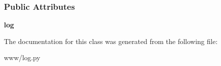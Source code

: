 \subsubsection*{Public Attributes}
\begin{DoxyCompactItemize}
\item 
\hypertarget{classlog_1_1_log_aca062fc7377922940a156e9a2d64cf55}{{\bfseries log}}\label{classlog_1_1_log_aca062fc7377922940a156e9a2d64cf55}

\end{DoxyCompactItemize}


The documentation for this class was generated from the following file\-:\begin{DoxyCompactItemize}
\item 
www/log.\-py\end{DoxyCompactItemize}
